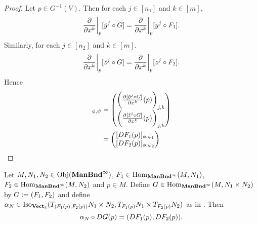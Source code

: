 \documentclass{book}
\begin{document}
	\begin{proof}
		Let $p \in G^{-1}(V)$. Then for each $j \in [n_1]$ and $k \in [m]$, 
		\begin{align*}
			\frac{\partial}{\partial x^k} \bigg|_p [\tilde{y}^j \circ G] 
			= \frac{\partial}{\partial x^k} \bigg|_p [y^j \circ F_1].
		\end{align*}
		Similarly, for each $j \in [n_2]$ and $k \in [m]$.  
		$$\frac{\partial}{\partial x^k} \bigg|_p [\tilde{z}^j \circ G]  = \frac{\partial}{\partial x^k} \bigg|_p [z^j \circ F_2].$$
		Hence 
		\begin{align*}
			[DG(p)]_{\phi, \psi}
			& = 
			\begin{pmatrix}
				\bigg( \frac{\p [\tl{y}^j \circ G]}{\p x^k}(p) \bigg)_{j,k} \\
				\bigg( \frac{\p [\tl{z}^j \circ G]}{\p x^k}(p) \bigg)_{j,k}
			\end{pmatrix} \\
			& = \begin{pmatrix}
				[DF_1(p)]_{\phi, \psi_1} \\
				[DF_2(p)]_{\phi, \psi_2}
			\end{pmatrix} 
		\end{align*}
	\end{proof}

	\begin{ex} 
		Let $M,N_1, N_2 \in \operatorname{Obj}(\operatorname*{\text{\textbf{ManBnd}}^{\infty}})$, $F_1 \in \operatorname{Hom}_{\operatorname*{\text{\textbf{ManBnd}}^{\infty}}}(M, N_1)$, $F_2 \in \operatorname{Hom}_{\operatorname*{\text{\textbf{ManBnd}}^{\infty}}}(M, N_2)$ and $p \in M$. Define $G \in \operatorname{Hom}_{\operatorname*{\text{\textbf{ManBnd}}^{\infty}}}(M, N_1 \times N_2)$ by $G \vcentcolon= (F_1, F_2)$ and define $\alpha_N \in \operatorname{Iso}_{\operatorname*{\text{\textbf{Vect}}_{\mathbb{R}}}}(T_{(F_1(p), F_2(p))} N_1 \times N_2, T_{F_1(p)} N_1 \times T_{F_2(p)} N_2)$ as in . Then 
		$$\alpha_N \circ DG(p) = (DF_1(p), DF_2(p)).$$ 
	\end{ex}
\end{document}
